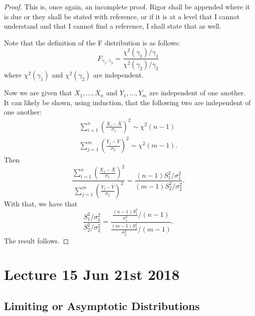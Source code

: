 \documentclass[notoc,notitlepage]{tufte-book}
\begin{document}
\begin{proof}
  This is, once again, an incomplete proof. Rigor shall be appended where it is due or they shall be stated with reference, or if it is at a level that I cannot understand and that I cannot find a reference, I shall state that as well.

  Note that the definition of the F distribution is as follows:
  \begin{equation*}
    F_{\gamma_1, \gamma_2} = \frac{\chi^2( \gamma_1 ) / \gamma_1}{\chi^2( \gamma_2 ) / \gamma_2}
  \end{equation*}
  where $\chi^2(\gamma_1)$ and $\chi^2(\gamma_2)$ are independent.

  Now we are given that $X_1, ..., X_n$ and $Y_1, ..., Y_m$ are independent of one another. It can likely be shown, using induction, that the following two are independent of one another:
  \begin{gather*}
    \sum_{i=1}^{n} \left( \frac{X_i - \bar{X}}{\sigma_1} \right)^2 \sim \chi^2( n - 1 ) \\
    \sum_{j=1}^{m} \left( \frac{Y_j - \bar{Y}}{\sigma_2} \right)^2 \sim \chi^2( m - 1 ).
  \end{gather*}
  Then
  \begin{equation*}
    \frac{\sum\limits_{i=1}^{n} \left( \frac{X_1 - \bar{X}}{\sigma_1} \right)^2}{\sum\limits_{j=1}^{m} \left( \frac{Y_j - \bar{Y}}{\sigma_2} \right)^2}
    = \frac{( n - 1 ) S_1^2 / \sigma_1^2}{( m - 1 ) S_2^2 / \sigma_2^2}.
  \end{equation*}
  With that, we have that
  \begin{equation*}
    \frac{S_1^2 / \sigma_1^2}{S_2^2 / \sigma_2^2} = \frac{\frac{(n-1)S_1^2}{\sigma_1^2} / ( n - 1 )}{\frac{(m-1)S_2^2}{\sigma_2^2} / ( m - 1 )}.
  \end{equation*}
  The result follows.
\end{proof}




\chapter{Lecture 15 Jun 21st 2018}%
\label{chp:lecture_15_jun_21st_2018}

\section{Limiting or Asymptotic Distributions}%
\label{sec:limiting_or_asymptotic_distributions}
\end{document}
